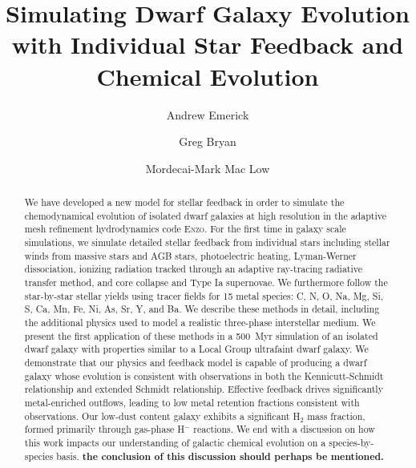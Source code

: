 \documentclass[twocolumn]{aastex61}
\begin{document}
\title{Simulating Dwarf Galaxy Evolution with Individual Star Feedback and Chemical Evolution}
\author{Andrew Emerick}
\author{Greg Bryan}
\author{Mordecai-Mark Mac Low}


\begin{abstract}
We have developed a new model for stellar feedback in order to simulate the chemodynamical evolution of isolated dwarf galaxies at high resolution in the adaptive mesh refinement hydrodynamics code \textsc{Enzo}. For the first time in galaxy scale simulations, we simulate detailed stellar feedback from individual stars including stellar winds from massive stars and AGB stars, photoelectric heating, Lyman-Werner dissociation, ionizing radiation tracked through an adaptive ray-tracing radiative transfer method, and core collapse and Type Ia supernovae. 
We furthermore follow the star-by-star stellar yields using tracer fields for 15 metal species: C, N, O, Na, Mg, Si, S, Ca, Mn, Fe, Ni, As, Sr, Y, and Ba. We describe these methods in detail, including the additional physics used to model a realistic three-phase interstellar medium. We present the first application of these methods in a 500~Myr simulation of an isolated dwarf galaxy with properties similar to a Local Group ultrafaint dwarf galaxy. We demonstrate that our physics and feedback model is capable of producing a dwarf galaxy whose evolution is consistent with observations in both the Kennicutt-Schmidt relationship and extended Schmidt relationship. Effective feedback drives significantly metal-enriched outflows, leading to low metal retention fractions consistent with observations. Our low-dust content galaxy exhibits a significant H$_2$ mass fraction, formed primarily through gas-phase H$^{-}$ reactions. We end with a discussion on how this work impacts our understanding of galactic chemical evolution on a species-by-species basis. {\bf the conclusion of this discussion should perhaps be mentioned.}
\end{abstract}
\end{document}
